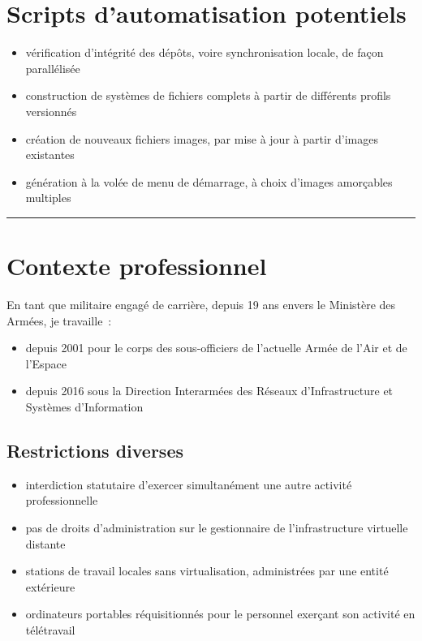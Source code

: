 \documentclass[10pt]{article}
\newcommand{\hr}{\rule{\textwidth}{1pt}}
\newenvironment{itmz}{\begin{itemize}
\setlength{\itemsep}{0em}
}{\end{itemize}}
\begin{document}
\section{Scripts d’automatisation potentiels}

\begin{itmz}
\item{vérification d’intégrité des dépôts, voire synchronisation locale, de façon parallélisée}
\item{construction de systèmes de fichiers complets à partir de différents profils versionnés}
\item{création de nouveaux fichiers images, par mise à jour à partir d’images existantes}
\item{génération à la volée de menu de démarrage, à choix d’images amorçables multiples}
\end{itmz}

\hr

\appendix

\section{Contexte professionnel}

En tant que militaire engagé de carrière, depuis 19 ans envers le Ministère des Armées, je travaille :
\begin{itmz}
\item{depuis 2001 pour le corps des sous-officiers de l’actuelle Armée de l’Air et de l’Espace}
\item{depuis 2016 sous la Direction Interarmées des Réseaux d’Infrastructure et Systèmes d’Information}
\end{itmz}

\subsection{Restrictions diverses}

\begin{itmz}
\item{interdiction statutaire d’exercer simultanément une autre activité professionnelle}
\item{pas de droits d’administration sur le gestionnaire de l’infrastructure virtuelle distante}
\item{stations de travail locales sans virtualisation, administrées par une entité extérieure}
\item{ordinateurs portables réquisitionnés pour le personnel exerçant son activité en télétravail}
\end{itmz}
\end{document}
